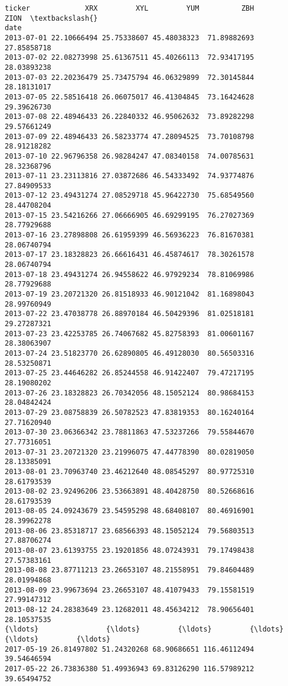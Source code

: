 \documentclass[11pt]{article}
\begin{document}
\begin{Verbatim}[commandchars=\\\{\}]
ticker             XRX         XYL         YUM          ZBH        ZION  \textbackslash{}
date                                                                      
2013-07-01 22.10666494 25.75338607 45.48038323  71.89882693 27.85858718   
2013-07-02 22.08273998 25.61367511 45.40266113  72.93417195 28.03893238   
2013-07-03 22.20236479 25.73475794 46.06329899  72.30145844 28.18131017   
2013-07-05 22.58516418 26.06075017 46.41304845  73.16424628 29.39626730   
2013-07-08 22.48946433 26.22840332 46.95062632  73.89282298 29.57661249   
2013-07-09 22.48946433 26.58233774 47.28094525  73.70108798 28.91218282   
2013-07-10 22.96796358 26.98284247 47.08340158  74.00785631 28.32368796   
2013-07-11 23.23113816 27.03872686 46.54333492  74.93774876 27.84909533   
2013-07-12 23.49431274 27.08529718 45.96422730  75.68549560 28.44708204   
2013-07-15 23.54216266 27.06666905 46.69299195  76.27027369 28.77929688   
2013-07-16 23.27898808 26.61959399 46.56936223  76.81670381 28.06740794   
2013-07-17 23.18328823 26.66616431 46.45874617  78.30261578 28.06740794   
2013-07-18 23.49431274 26.94558622 46.97929234  78.81069986 28.77929688   
2013-07-19 23.20721320 26.81518933 46.90121042  81.16898043 28.99760949   
2013-07-22 23.47038778 26.88970184 46.50429396  81.02518181 29.27287321   
2013-07-23 23.42253785 26.74067682 45.82758393  81.00601167 28.38063907   
2013-07-24 23.51823770 26.62890805 46.49128030  80.56503316 28.53250871   
2013-07-25 23.44646282 26.85244558 46.91422407  79.47217195 28.19080202   
2013-07-26 23.18328823 26.70342056 48.15052124  80.98684153 28.04842424   
2013-07-29 23.08758839 26.50782523 47.83819353  80.16240164 27.71620940   
2013-07-30 23.06366342 23.78811863 47.53237266  79.55844670 27.77316051   
2013-07-31 23.20721320 23.21996075 47.44778390  80.02819050 28.13385091   
2013-08-01 23.70963740 23.46212640 48.08545297  80.97725310 28.61793539   
2013-08-02 23.92496206 23.53663891 48.40428750  80.52668616 28.61793539   
2013-08-05 24.09243679 23.54595298 48.68408107  80.46916901 28.39962278   
2013-08-06 23.85318717 23.68566393 48.15052124  79.56803513 27.88706274   
2013-08-07 23.61393755 23.19201856 48.07243931  79.17498438 27.57383161   
2013-08-08 23.87711213 23.26653107 48.21558951  79.84604489 28.01994868   
2013-08-09 23.99673694 23.26653107 48.41079433  79.15581519 27.99147312   
2013-08-12 24.28383649 23.12682011 48.45634212  78.90656401 28.10537535   
{\ldots}                {\ldots}         {\ldots}         {\ldots}          {\ldots}         {\ldots}   
2017-05-19 26.81497802 51.24320268 68.90686651 116.46112494 39.54646594   
2017-05-22 26.73836380 51.49936943 69.83126290 116.57989212 39.65494752   

\end{Verbatim}
\end{document}
